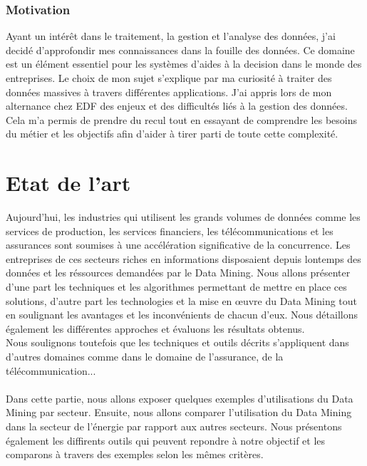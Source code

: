 \documentclass[11pt,a4paper]{report}
\begin{document}
\subsubsection{Motivation}
Ayant un intérêt  dans le traitement, la gestion et l'analyse des données, j'ai decidé  d'approfondir mes connaissances dans la fouille des données. Ce domaine est un élément essentiel pour les systèmes d'aides à la decision dans le monde des entreprises.    
Le choix de mon sujet s'explique par ma curiosité à traiter des données massives à travers différentes applications. J'ai appris lors de mon alternance chez EDF des enjeux et des difficultés liés à la gestion des données. Cela m'a permis de prendre du recul tout en essayant de comprendre les besoins du métier et les objectifs afin d'aider à tirer parti de toute cette complexité.  

\newpage

\section{Etat de l'art}
%
Aujourd'hui, les industries qui utilisent les grands volumes de données comme les services de production, les services financiers, les télécommunications et les assurances sont soumises à une accélération significative de la concurrence. Les entreprises de ces secteurs riches en informations disposaient depuis lontemps des données et les réssources demandées par le Data Mining. Nous allons présenter d’une part les techniques et les algorithmes permettant de mettre en place ces solutions, d’autre part les technologies et la mise en œuvre du Data Mining tout en soulignant les avantages et les inconvénients de chacun d’eux. Nous détaillons également les différentes approches et évaluons les résultats obtenus.\\
 Nous soulignons toutefois que les techniques et outils décrits s'appliquent dans d'autres domaines comme dans le domaine de l'assurance, de la télécommunication... \\\\
 Dans cette partie, nous allons exposer quelques exemples d'utilisations du Data Mining par secteur. Ensuite, nous allons comparer l'utilisation du Data Mining dans la secteur de l'énergie par rapport aux autres secteurs. 
 Nous présentons également les diffirents outils qui peuvent repondre à notre objectif et les comparons à travers des exemples selon les mêmes critères. 
\end{document}
